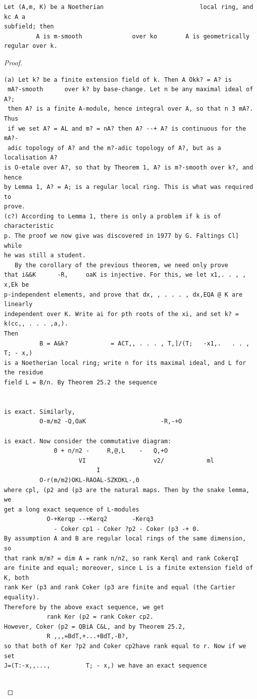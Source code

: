 \begin{theorem}\label{mcrt-auto-theorem-28-7}\uses{}
\begin{verbatim}
Let (A,m, K) be a Noetherian                           local ring, and kc A a
subfield; then
         A is m-smooth              over ko        A is geometrically     regular over k.
\end{verbatim}
\end{theorem}
\begin{proof}
\begin{verbatim}
(a) Let k? be a finite extension field of k. Then A Okk? = A? is
 mA?-smooth      over k? by base-change. Let n be any maximal ideal of A?;
 then A? is a finite A-module, hence integral over A, so that n 3 mA?. Thus
 if we set A? = AL and m? = nA? then A? --+ A? is continuous for the mA?-
 adic topology of A? and the m?-adic topology of A?, but as a localisation A?
is O-etale over A?, so that by Theorem 1, A? is m?-smooth over k?, and hence
by Lemma 1, A? = A; is a regular local ring. This is what was required to
prove.
(c?) According to Lemma 1, there is only a problem if k is of characteristic
p. The proof we now give was discovered in 1977 by G. Faltings Cl] while
he was still a student.
   By the corollary of the previous theorem, we need only prove
that i&&K      -R,     oaK is injective. For this, we let x1,. . , , x,Ek be
p-independent elements, and prove that dx, , . . . , dx,EQA @ K are linearly
independent over K. Write ai for pth roots of the xi, and set k? = k(cc,, . . . ,a,).
Then
          B = A&k?            = ACT,, . . . , T,]/(T;   -x1,.   . . , T; - x,)
is a Noetherian local ring; write n for its maximal ideal, and L for the residue
field L = B/n. By Theorem 25.2 the sequence


is exact. Similarly,
          O-m/m2 -Q,OaK                     -R,-+O

is exact. Now consider the commutative diagram:
              0 + n/n2 -     R,@,L    -   Q,+O
                     VI                   v2/            ml
                          I
          O-r(m/m2)OKL-RAOAL-SZKOKL-,0
where cpl, (p2 and (p3 are the natural maps. Then by the snake lemma, we
get a long exact sequence of L-modules
            O-+Kerqp --+Kerq2       -Kerq3
              - Coker cp1 - Coker ?p2 - Coker (p3 -+ 0.
By assumption A and B are regular local rings of the same dimension, so
that rank m/m? = dim A = rank n/n2, so rank Kerql and rank CokerqI
are finite and equal; moreover, since L is a finite extension field of K, both
rank Ker (p3 and rank Coker (p3 are finite and equal (the Cartier equality).
Therefore by the above exact sequence, we get
            rank Ker (p2 = rank Coker cp2.
However, Coker (p2 = QBiA C&L, and by Theorem 25.2,
            R ,,,=BdT,+...+BdT,-B?,
so that both of Ker ?p2 and Coker cp2have rank equal to r. Now if we set
J=(T:-x,,...,          T; - x,) we have an exact sequence


\end{verbatim}
\end{proof}
